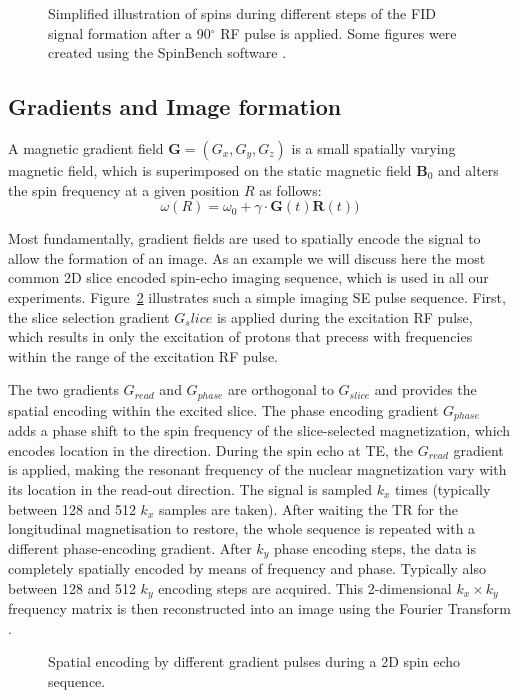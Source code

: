 \begin{figure}[ht]
\centering
{}
\caption{Simplified illustration of spins during different steps of the FID signal formation after a 90$^\circ$ RF pulse is applied. Some figures were created using the SpinBench software \citep{Overall:2007}.}
\label{fig:chap2 SE sequence}
\end{figure}


\subsection*{Gradients and Image formation}
A magnetic gradient field $\textbf{G}=(G_{x},G_{y},G_{z})$ is a small spatially varying magnetic field, which is superimposed on the static magnetic field $\textbf{B}_{0}$ and alters the spin frequency at a given position $R$ as follows:
\begin{equation}
\omega(R)= \omega_0 + \gamma \cdot \textbf{G}(t)\textbf{R}(t))
\end{equation}


Most fundamentally, gradient fields are used to spatially encode the signal to allow the formation of an image. As an example we will discuss here the most common 2D slice encoded spin-echo imaging sequence, which is used in all our experiments. Figure~\ref{fig:chapter2 SE imaging sequence} illustrates such a simple imaging SE pulse sequence. First, the slice selection gradient $G_slice$ is applied during the excitation RF pulse, which results in only the excitation of protons that precess with frequencies within the range of the excitation RF pulse. 

The two gradients $G_{read}$ and $G_{phase}$ are orthogonal to $G_{slice}$ and provides the spatial encoding within the excited slice. The phase encoding gradient $G_{phase}$ adds a phase shift to the spin frequency of the slice-selected magnetization, which encodes location in the  direction. During the spin echo at TE, the $G_{read}$ gradient is applied, making the resonant frequency of the nuclear magnetization vary with its location in the read-out direction. The signal is sampled $k_x$ times (typically between 128 and 512 $k_x$ samples are taken).
After waiting the \gls{TR} for the longitudinal magnetisation to restore, the whole sequence is repeated with a different phase-encoding gradient. After $k_y$ phase encoding steps, the data is completely spatially encoded by means of frequency and phase. Typically also between 128 and 512 $k_y$ encoding steps are acquired. This 2-dimensional $k_x\times k_y$ frequency matrix is then reconstructed into an image using the Fourier Transform \citep{Ljunggren:1983,Twieg:1983}.
\begin{figure}[ht]
\centering
{}
\caption{Spatial encoding by different gradient pulses during a 2D spin echo sequence.}
\label{fig:chapter2 SE imaging sequence}
\end{figure}


